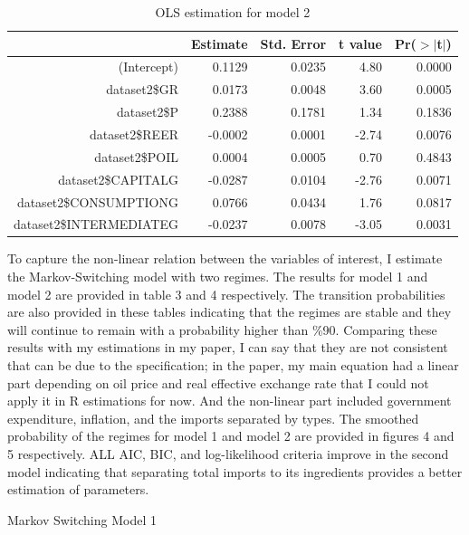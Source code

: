 \documentclass{article}
\begin{document}
\begin{table}[ht]
	\centering
	\caption{OLS estimation for model 2}
	\begin{tabular}{rrrrr}
		\hline
		& Estimate & Std. Error & t value & Pr($>$$|$t$|$) \\ 
		\hline
		(Intercept) & 0.1129 & 0.0235 & 4.80 & 0.0000 \\ 
		dataset2\$GR & 0.0173 & 0.0048 & 3.60 & 0.0005 \\ 
		dataset2\$P & 0.2388 & 0.1781 & 1.34 & 0.1836 \\ 
		dataset2\$REER & -0.0002 & 0.0001 & -2.74 & 0.0076 \\ 
		dataset2\$POIL & 0.0004 & 0.0005 & 0.70 & 0.4843 \\ 
		dataset2\$CAPITALG & -0.0287 & 0.0104 & -2.76 & 0.0071 \\ 
		dataset2\$CONSUMPTIONG & 0.0766 & 0.0434 & 1.76 & 0.0817 \\ 
		dataset2\$INTERMEDIATEG & -0.0237 & 0.0078 & -3.05 & 0.0031 \\ 
		\hline
	\end{tabular}
\end{table}


To capture the non-linear relation between the variables of interest, I estimate the Markov-Switching model with two regimes. The results for model 1 and model 2 are provided in table 3 and 4 respectively. The transition probabilities are also provided in these tables indicating that the regimes are stable and they will continue to remain with a probability higher than \%90. Comparing these results with my estimations in my paper, I can say that they are not consistent that can be due to the specification; in the paper, my main equation had a linear part depending on oil price and real effective exchange rate that I could not apply it in R estimations for now. And the non-linear part included government expenditure, inflation, and the imports separated by types. The smoothed probability of the regimes for model 1 and model 2 are provided in figures 4 and 5 respectively. ALL AIC, BIC, and log-likelihood criteria improve in the second model indicating that separating total imports to its ingredients provides a better estimation of parameters. 

\begin{table}
	\centering
	\caption{Markov Switching Model 1}
	\hline
	
	\hline
\end{table}
\end{document}
